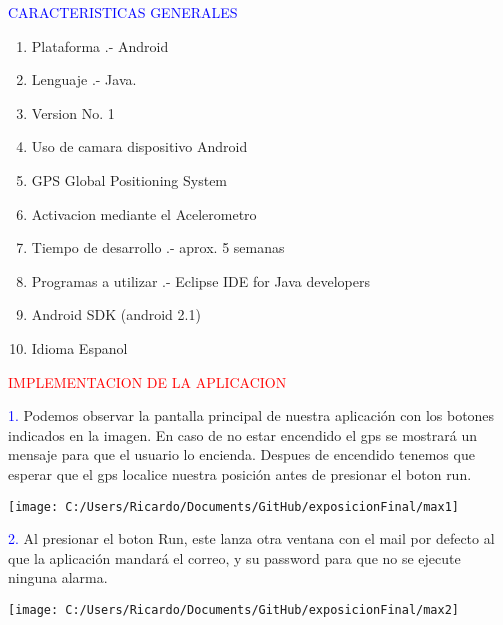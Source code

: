 \documentclass{beamer}
\begin{document}
      \scriptsize
    \begin{frame}
      \begin{center}
       \textcolor{blue}{ CARACTERISTICAS GENERALES\\}
      \end{center}
      
      \begin{enumerate}
      \item<1-> Plataforma .- Android
      \item<1-> Lenguaje .- Java.
      \item<1-> Version No. 1
      \item<1-> Uso de camara dispositivo Android
      \item<1-> GPS Global Positioning System
      \item<1-> Activacion mediante el Acelerometro
      \item<1-> Tiempo de desarrollo .- aprox. 5 semanas
      \item<1-> Programas a utilizar .- Eclipse IDE for Java developers
      \item<1-> Android SDK (android 2.1)
      \item<1-> Idioma{\tiny } Espanol
     \end{enumerate}
      
    \end{frame}
  
  \begin{frame}
       \scriptsize
        \begin{center}
                 \textcolor{red}{IMPLEMENTACION DE LA APLICACION\\}
         \end{center}
          \textcolor{blue}{1.}
          Podemos observar la pantalla principal de nuestra aplicación con los botones indicados en la imagen. En caso de no estar encendido el gps se mostrará un mensaje para que el usuario lo encienda. Despues de encendido tenemos que esperar que el gps localice nuestra posición antes de presionar el boton run.
           \begin{center}
                  \texttt{[image: C:/Users/Ricardo/Documents/GitHub/exposicionFinal/max1]} 
         \end{center}

        \textcolor{blue}{2.}
         Al presionar el boton Run, este lanza otra ventana con el mail por defecto al que la  aplicación mandará el correo, y su password  para que no se ejecute ninguna alarma.
           \begin{center}
                 \texttt{[image: C:/Users/Ricardo/Documents/GitHub/exposicionFinal/max2]} 
         \end{center}
  \end{frame}
\end{document}
